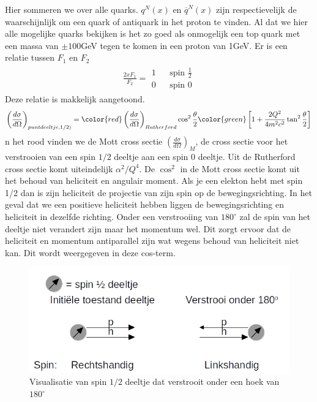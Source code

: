 \documentclass[../main.tex]{subfiles}
\begin{document}
Hier sommeren we over alle quarks. $q^N(x)$ en $\overline q^N(x)$ zijn respectievelijk de waarschijnlijk om een quark of antiquark in het proton te vinden. Al dat we hier alle mogelijke quarks bekijken is het zo goed als onmogelijk een top quark met een massa van $\pm100$GeV tegen te komen in een proton van 1GeV. Er is een relatie tussen $F_1$ en $F_2$
\begin{equation}
    \begin{aligned}
        \label{eq:struct_func_rel}
        \frac{2xF_1}{F_2} =
        \begin{matrix}
            1 & & \text{spin } \frac{1}{2} \\
            0 & & \text{spin } 0
        \end{matrix}
    \end{aligned}
\end{equation}
Deze relatie is makkelijk aangetoond.
\begin{equation}
    \begin{aligned}
        \label{eq:bewijs_struct_func_rel_1}
        \left(\frac{d\sigma}{d\Omega}\right)_{puntdeeltje,1/2)} = {\color{red} \left(\frac{d\sigma}{d\Omega}\right)_{Rutherford}\cos^2  \frac{\theta}{2}} {\color{green} \left[1+ \frac{2Q^2}{4m^2c^2} \tan^2 \frac{\theta}{2} \right]}
    \end{aligned}
\end{equation}
n het rood vinden we de Mott cross sectie $\left(\frac{d\sigma}{d\Omega}\right)_{M}$, de cross sectie voor het verstrooien van een spin $1/2$ deeltje aan een spin $0$ deeltje. Uit de Rutherford cross sectie komt uiteindelijk $\alpha^2/Q^4$. De $\cos^2$ in de Mott cross sectie komt uit het behoud van heliciteit en angulair moment. Als je een elekton hebt met spin 1/2 dan is zijn heliciteit de projectie van zijn spin op de bewegingsrichting. In het geval dat we een positieve heliciteit hebben liggen de bewegingsrichting en heliciteit in dezelfde richting. Onder een verstrooiing van $180^\circ$ zal de spin van het deeltje niet verandert zijn maar het momentum wel. Dit zorgt ervoor dat de heliciteit en momentum antiparallel zijn wat wegens behoud van heliciteit niet kan. Dit wordt weergegeven in deze cos-term.

\begin{figure}[h]
    \centering
    \includegraphics[width=0.8\linewidth]{DIS_nucleon_structuur_pdf/mot_cross_section.jpg}
    \caption{Visualisatie van spin $1/2$ deeltje dat verstrooit onder een hoek van $180^\circ$}%
    \label{fig:mot_cross_section}
\end{figure}
\end{document}
